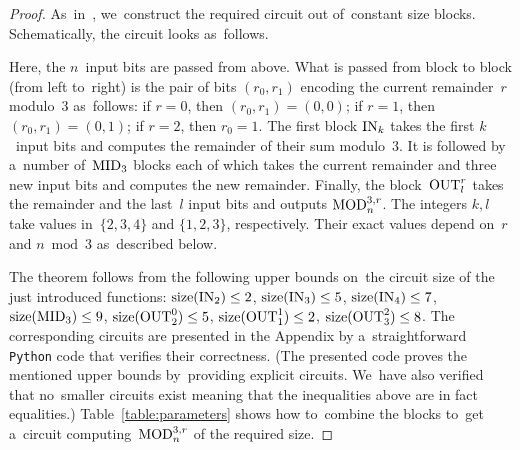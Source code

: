 \begin{proof}
As~in~\cite{DBLP:conf/sat/KojevnikovKY09},
we~construct the required circuit out of~constant size blocks. Schematically, the circuit looks as~follows.

\begin{center}
\end{center}
%
Here, the $n$~input bits are passed from above.
What is passed from block to block (from left to~right)
is the pair of bits $(r_0, r_1)$ encoding the current remainder~$r$ modulo~$3$ as~follows: if $r=0$, then $(r_0,r_1)=(0,0)$; if $r=1$, then $(r_0,r_1)=(0,1)$; if $r=2$, then $r_0=1$. The first block $\operatorname{IN}_k$ takes the first $k$~input bits and computes the remainder of their sum modulo~$3$. It is followed by a~number of~$\operatorname{MID}_3$ blocks each of which takes the current remainder and three new input bits and computes the new remainder. Finally, the block~$\operatorname{OUT}_l^r$ takes the remainder and the last~$l$ input bits and outputs $\operatorname{MOD}_n^{3,r}$. The integers $k,l$ take values in~$\{2,3,4\}$ and $\{1,2,3\}$, respectively. Their exact values depend on~$r$ and $n \bmod 3$ as~described below.

The theorem follows from the following upper bounds
on~the circuit size of the just introduced functions:
$\operatorname{size}(\operatorname{IN}_2) \le 2$,
$\operatorname{size}(\operatorname{IN}_3) \le 5$,
$\operatorname{size}(\operatorname{IN}_4) \le 7$,
$\operatorname{size}(\operatorname{MID}_3) \le 9$,
$\operatorname{size}(\operatorname{OUT}_2^0) \le 5$,
$\operatorname{size}(\operatorname{OUT}_1^1) \le 2$,
$\operatorname{size}(\operatorname{OUT}_3^2) \le 8$.
The corresponding circuits are presented in the Appendix
by a~straightforward \texttt{Python} code that verifies their correctness. (The presented code proves the mentioned upper bounds by~providing explicit circuits. We~have also verified that no~smaller circuits exist meaning that the
inequalities above are in fact equalities.)
%
Table~\ref{table:parameters} shows how to~combine
the blocks to~get a~circuit computing~$\operatorname{MOD}_n^{3,r}$ of the required size.


\end{proof}
